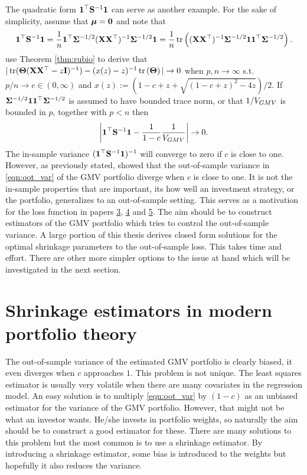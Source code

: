 \documentclass[12pt, oneside]{book}\usepackage{knitr}
\begin{document}
The quadratic form $\mathbf{1}^\top \mathbf{S}^{-1} \mathbf{1}$ can serve as another example. 
For the sake of simplicity, assume that $\mbox{\boldmath$\mu$} = \mathbf{0}$ and note that
\begin{equation}
  \mathbf{1}^\top \mathbf{S}^{-1} \mathbf{1} = \frac{1}{n}\mathbf{1}^\top \mathbf{\Sigma}^{-1/2} (\mathbf{X} \mathbf{X}^\top)^{-1} \mathbf{\Sigma}^{-1/2} \mathbf{1} = \frac{1}{n}\operatorname{tr} \left((\mathbf{X} \mathbf{X}^\top)^{-1} \mathbf{\Sigma}^{-1/2} \mathbf{1}\mathbf{1}^\top \mathbf{\Sigma}^{-1/2}\right).
\end{equation}
\citet{bodnar2018estimation} use Theorem \ref{thm:rubio} to derive that $|\operatorname{tr}(\mathbf{\Theta}(\mathbf{X} \mathbf{X}^\top -z\mathbf{I})^{-1}) - (x(z)-z)^{-1}\operatorname{tr}\left(\mathbf{\Theta}\right)| \rightarrow 0$ when $p,n \rightarrow \infty$ s.t. $p/n \rightarrow c \in (0,\infty)$ and $x(z) := (1-c + z + \sqrt{(1-c+z)^2-4z})/2$.
If $\mathbf{\Sigma}^{-1/2} \mathbf{1}\mathbf{1}^\top \mathbf{\Sigma}^{-1/2}$ is assumed to have bounded trace norm, or that $1/V_{GMV}$ is bounded in $p$, together with $p<n$ then
$$
\left|\mathbf{1}^\top \mathbf{S}^{-1} \mathbf{1} - \frac{1}{1-c}\frac{1}{V_{GMV}}\right| \rightarrow 0.
$$
The in-sample variance $(\mathbf{1}^\top \mathbf{S}^{-1}\mathbf{1})^{-1}$ will converge to zero if $c$ is close to one.
However, as previously stated, \citet{bodnar2018estimation} showed that the out-of-sample variance in \eqref{eqn:oot_var} of the GMV portfolio diverge when $c$ is close to one.
It is not the in-sample properties that are important, its how well an investment strategy, or the portfolio, generalizes to an out-of-sample setting.
This serves as a motivation for the loss function in papers \hyperref[sec:paper3]{3}, \hyperref[sec:paper4]{4} and \hyperref[sec:paper5]{5}.
The aim should be to construct estimators of the GMV portfolio which tries to control the out-of-sample variance.
A large portion of this thesis derives closed form solutions for the optimal shrinkage parameters to the out-of-sample loss.
This takes time and effort.
There are other more simpler options to the issue at hand which will be investigated in the next section.

\section{Shrinkage estimators in modern portfolio theory}
The out-of-sample variance of the estimated GMV portfolio is clearly biased, it even diverges when $c$ approaches $1$.
This problem is not unique.
The least squares estimator is usually very volatile when there are many covariates in the regression model. 
An easy solution is to multiply \eqref{eqn:oot_var} by $(1-c)$ as an unbiased estimator for the variance of the GMV portfolio.
However, that might not be what an investor wants.
He/she invests in portfolio weights, so naturally the aim should be to construct a good estimator for these.
There are many solutions to this problem but the most common is to use a shrinkage estimator.
By introducing a shrinkage estimator, some bias is introduced to the weights but hopefully it also reduces the variance.
\end{document}
